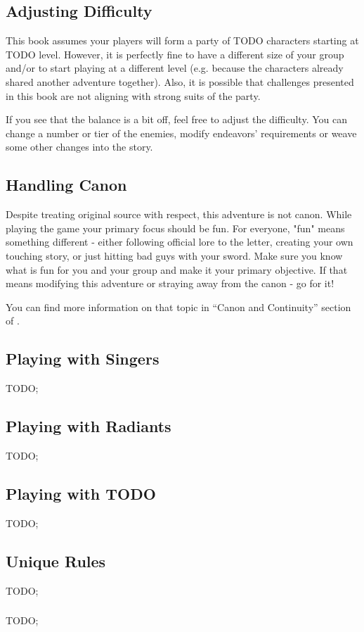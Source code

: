 \subsection{Adjusting Difficulty}

This book assumes your players will form a party of TODO characters starting at TODO level. However, it is perfectly fine to have a different size of your group and/or to start playing at a different level (e.g. because the characters already shared another adventure together). Also, it is possible that challenges presented in this book are not aligning with strong suits of the party.

If you see that the balance is a bit off, feel free to adjust the difficulty. You can change a number or tier of the enemies, modify endeavors' requirements or weave some other changes into the story.



\subsection{Handling Canon}
\label{ssec:runningAdventureCanon}

Despite treating original source with respect, this adventure is not canon. While playing the game your primary focus should be fun. For everyone, "fun" means something different - either following official lore to the letter, creating your own touching story, or just hitting bad guys with your sword. Make sure you know what is fun for you and your group and make it your primary objective. If that means modifying this adventure or straying away from the canon - go for it!

You can find more information on that topic in “Canon and Continuity” section of \handbook{}.




\subsection{Playing with Singers}

TODO; \lipsum[1][1-5]



\subsection{Playing with Radiants}

TODO; \lipsum[1][1-5]


\subsection{Playing with TODO}

TODO; \lipsum[1][1-5]



\subsection{Unique Rules}

TODO; \lipsum[1][1-5]


\subsubsection{\abilityExampleName{}}
\label{ssec:ruleExample}

TODO; \lipsum[1][1-5]

\abilityExample{}

\lipsum[1]


